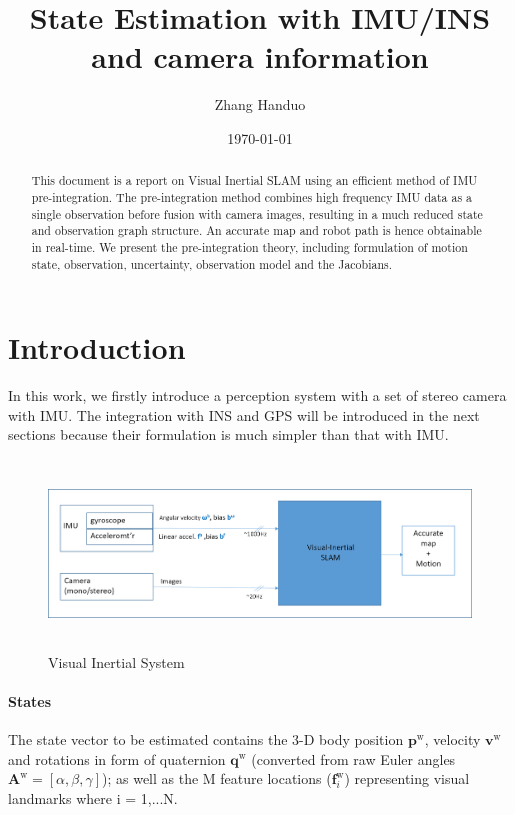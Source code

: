 \documentclass[12pt]{article}   %
\begin{document}


\title{State Estimation with IMU/INS and camera information}
\author{Zhang Handuo}
\date{\today}

\maketitle

\begin{abstract}
This document is a report on Visual Inertial SLAM using an efficient method of
IMU pre-integration. The pre-integration method combines high frequency IMU data
as a single observation before fusion with camera images, resulting in a much
reduced state and observation graph structure. An accurate map and robot path is
hence obtainable in real-time. We present the pre-integration theory, including
formulation of motion state, observation, uncertainty, observation model and the
Jacobians.
\end{abstract}

\newpage

\tableofcontents

\newpage

\section{Introduction}

\vspace{1cm}
In this work, we firstly introduce a perception system with a set of stereo
camera with IMU. The integration with INS and GPS will be introduced in the next
sections because their formulation is much simpler than that with IMU.
\begin{figure}[ht]
	\includegraphics[height=5cm]{figures/VIN_block-diagram.png}
	\caption{Visual Inertial System}
	\label{fig:vin}
\end{figure}

\paragraph{States}
The state vector to be estimated contains the 3-D body position
$\bm{p}^{\mathrm{w}}$, velocity $\bm{v}^{\mathrm{w}}$ and rotations in form of
quaternion $\bm{q}^{\mathrm{w}}$ (converted from raw Euler angles
$\bm{A}^{\mathrm{w}}=[\alpha,\beta,\gamma]$); as well as the M feature locations
($\bm{f}_i^{\mathrm{w}}$) representing visual landmarks where i = 1,...N. 
\end{document}
